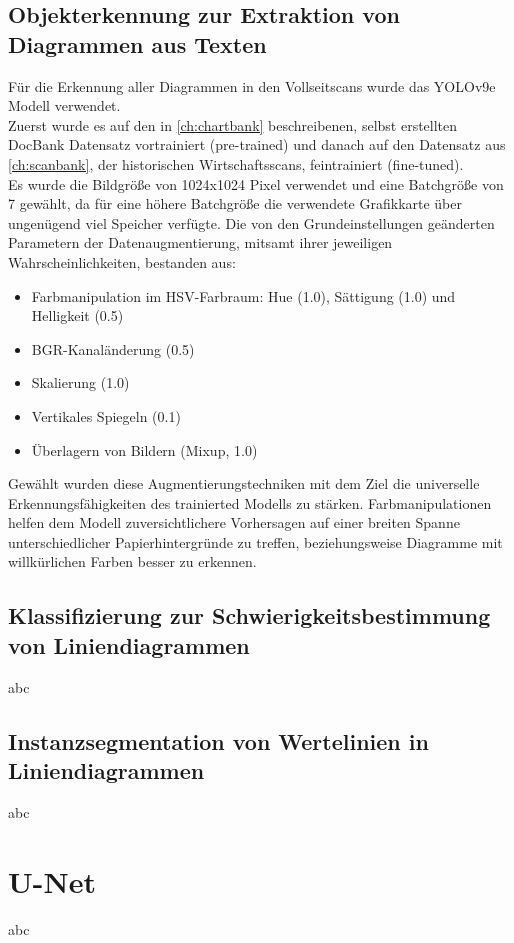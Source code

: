 \subsection{Objekterkennung zur Extraktion von Diagrammen aus Texten}

Für die Erkennung aller Diagrammen in den Vollseitscans wurde das YOLOv9e Modell verwendet.
\\
Zuerst wurde es auf den in \ref{ch:chartbank} beschreibenen, selbst erstellten DocBank Datensatz vortrainiert (pre-trained) und danach auf den Datensatz aus \ref{ch:scanbank}, der historischen Wirtschaftsscans, feintrainiert (fine-tuned).
\\
Es wurde die Bildgröße von 1024x1024 Pixel verwendet und eine Batchgröße von 7 gewählt, da für eine höhere Batchgröße die verwendete Grafikkarte über ungenügend viel Speicher verfügte. Die von den Grundeinstellungen geänderten Parametern der Datenaugmentierung, mitsamt ihrer jeweiligen Wahrscheinlichkeiten, bestanden aus:

\begin{itemize}[itemsep=0pt, topsep=0pt]
    \item Farbmanipulation im HSV-Farbraum: Hue (1.0), Sättigung (1.0) und Helligkeit (0.5)
    \item BGR-Kanaländerung (0.5)
    \item Skalierung (1.0)
    \item Vertikales Spiegeln (0.1)
    \item Überlagern von Bildern (Mixup, 1.0)
\end{itemize}

Gewählt wurden diese Augmentierungstechniken mit dem Ziel die universelle Erkennungsfähigkeiten des trainierted Modells zu stärken. Farbmanipulationen helfen dem Modell zuversichtlichere Vorhersagen auf einer breiten Spanne unterschiedlicher Papierhintergründe zu treffen, beziehungsweise Diagramme mit willkürlichen Farben besser zu erkennen.


\subsection{Klassifizierung zur Schwierigkeitsbestimmung von Liniendiagrammen}
abc
\subsection{Instanzsegmentation von Wertelinien in Liniendiagrammen}
abc


\section{U-Net}
abc

